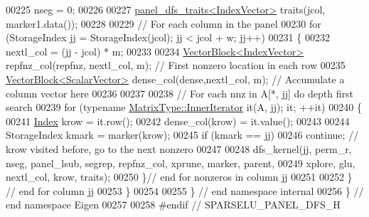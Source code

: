 \begin{DoxyCode}
00225   nseg = 0; 
00226   
00227   \hyperlink{struct_eigen_1_1internal_1_1panel__dfs__traits}{panel\_dfs\_traits<IndexVector>} traits(jcol, marker1.data());
00228   
00229   \textcolor{comment}{// For each column in the panel }
00230   \textcolor{keywordflow}{for} (StorageIndex jj = StorageIndex(jcol); jj < jcol + w; jj++) 
00231   \{
00232     nextl\_col = (jj - jcol) * m; 
00233     
00234     \hyperlink{group___core___module_class_eigen_1_1_vector_block}{VectorBlock<IndexVector>} repfnz\_col(repfnz, nextl\_col, m); \textcolor{comment}{// First nonzero
       location in each row}
00235     \hyperlink{group___core___module_class_eigen_1_1_vector_block}{VectorBlock<ScalarVector>} dense\_col(dense,nextl\_col, m); \textcolor{comment}{// Accumulate a
       column vector here}
00236     
00237     
00238     \textcolor{comment}{// For each nnz in A[*, jj] do depth first search}
00239     \textcolor{keywordflow}{for} (\textcolor{keyword}{typename} \hyperlink{class_eigen_1_1_sparse_compressed_base_1_1_inner_iterator}{MatrixType::InnerIterator} it(A, jj); it; ++it)
00240     \{
00241       \hyperlink{namespace_eigen_a62e77e0933482dafde8fe197d9a2cfde}{Index} krow = it.row(); 
00242       dense\_col(krow) = it.value();
00243       
00244       StorageIndex kmark = marker(krow); 
00245       \textcolor{keywordflow}{if} (kmark == jj) 
00246         \textcolor{keywordflow}{continue}; \textcolor{comment}{// krow visited before, go to the next nonzero}
00247       
00248       dfs\_kernel(jj, perm\_r, nseg, panel\_lsub, segrep, repfnz\_col, xprune, marker, parent,
00249                    xplore, glu, nextl\_col, krow, traits);
00250     \}\textcolor{comment}{// end for nonzeros in column jj}
00251     
00252   \} \textcolor{comment}{// end for column jj}
00253 \}
00254 
00255 \} \textcolor{comment}{// end namespace internal}
00256 \} \textcolor{comment}{// end namespace Eigen}
00257 
00258 \textcolor{preprocessor}{#endif // SPARSELU\_PANEL\_DFS\_H}
\end{DoxyCode}
